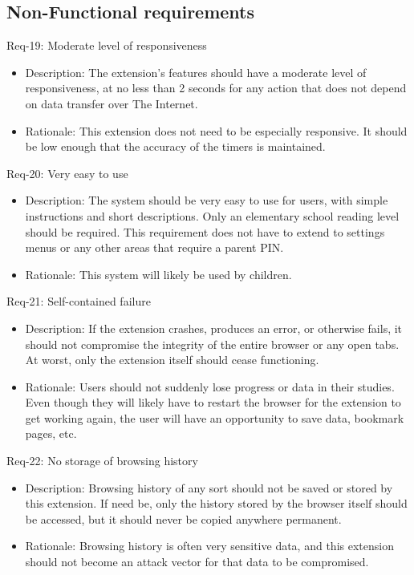 \documentclass[12pt]{article}
\begin{document}
\subsection{Non-Functional requirements}
\begin{itemize} %
\end{itemize}
Req-19: Moderate level of responsiveness
\begin{itemize}
    \item Description: The extension's features should have a moderate level of responsiveness, at no less than 2 seconds for any action that does not depend on data transfer over The Internet.
    \item Rationale: This extension does not need to be especially responsive. It should be low enough that the accuracy of the timers is maintained.
\end{itemize}
Req-20: Very easy to use
\begin{itemize}
    \item Description: The system should be very easy to use for users, with simple instructions and short descriptions. Only an elementary school reading level should be required. This requirement does not have to extend to settings menus or any other areas that require a parent PIN.
    \item Rationale: This system will likely be used by children.
\end{itemize}
Req-21: Self-contained failure
\begin{itemize}
    \item Description: If the extension crashes, produces an error, or otherwise fails, it should not compromise the integrity of the entire browser or any open tabs. At worst, only the extension itself should cease functioning.
    \item Rationale: Users should not suddenly lose progress or data in their studies. Even though they will likely have to restart the browser for the extension to get working again, the user will have an opportunity to save data, bookmark pages, etc.
\end{itemize}
Req-22:  No storage of browsing history
\begin{itemize}
    \item Description: Browsing history of any sort should not be saved or stored by this extension. If need be, only the history stored by the browser itself should be accessed, but it should never be copied anywhere permanent.
    \item Rationale: Browsing history is often very sensitive data, and this extension should not become an attack vector for that data to be compromised.
\end{itemize}
\end{document}
